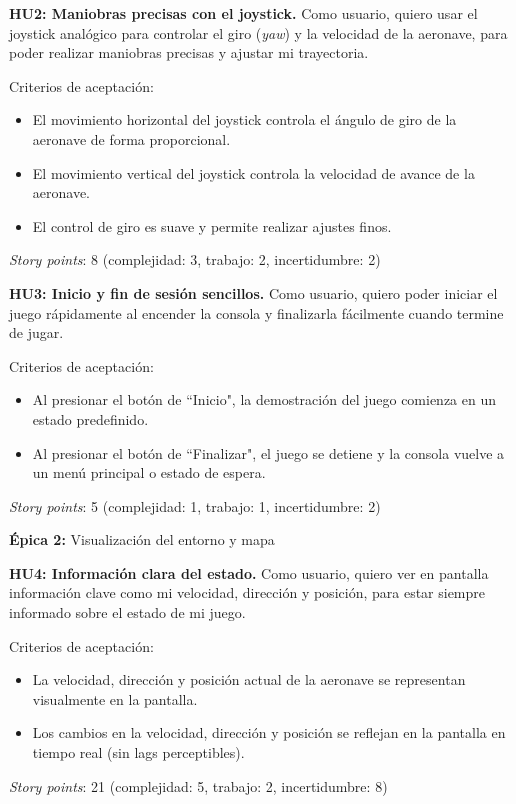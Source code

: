 \documentclass[
11pt, %
]{charter}
\begin{document}
	\textbf{HU2: Maniobras precisas con el joystick.} Como usuario, quiero usar el joystick analógico para controlar el giro (\textit{yaw}) y la velocidad de la aeronave, para poder realizar maniobras precisas y ajustar mi trayectoria.

	Criterios de aceptación:
	\begin{itemize}
		\item El movimiento horizontal del joystick controla el ángulo de giro de la aeronave de forma proporcional.
		\item El movimiento vertical del joystick controla la velocidad de avance de la aeronave.
		\item El control de giro es suave y permite realizar ajustes finos.
	\end{itemize}
	\textit{Story points}: 8 (complejidad: 3, trabajo: 2, incertidumbre: 2)
		
	\textbf{HU3: Inicio y fin de sesión sencillos.} Como usuario, quiero poder iniciar el juego rápidamente al encender la consola y finalizarla fácilmente cuando termine de jugar.

	Criterios de aceptación:
	\begin{itemize}
		\item Al presionar el botón de ``Inicio", la demostración del juego comienza en un estado predefinido.
		\item Al presionar el botón de ``Finalizar", el juego se detiene y la consola vuelve a un menú principal o estado de espera.
	\end{itemize}
	\textit{Story points}: 5 (complejidad: 1, trabajo: 1, incertidumbre: 2)
		
\textbf{Épica 2:} Visualización del entorno y mapa

	\textbf{HU4: Información clara del estado.} Como usuario, quiero ver en pantalla información clave como mi velocidad, dirección y posición, para estar siempre informado sobre el estado de mi juego.

	Criterios de aceptación:
	\begin{itemize}
		\item La velocidad, dirección y posición actual de la aeronave se representan visualmente en la pantalla.
		\item Los cambios en la velocidad, dirección y posición se reflejan en la pantalla en tiempo real (sin lags perceptibles).
	\end{itemize}
	\textit{Story points}: 21 (complejidad: 5, trabajo: 2, incertidumbre: 8)
		
\end{document}
